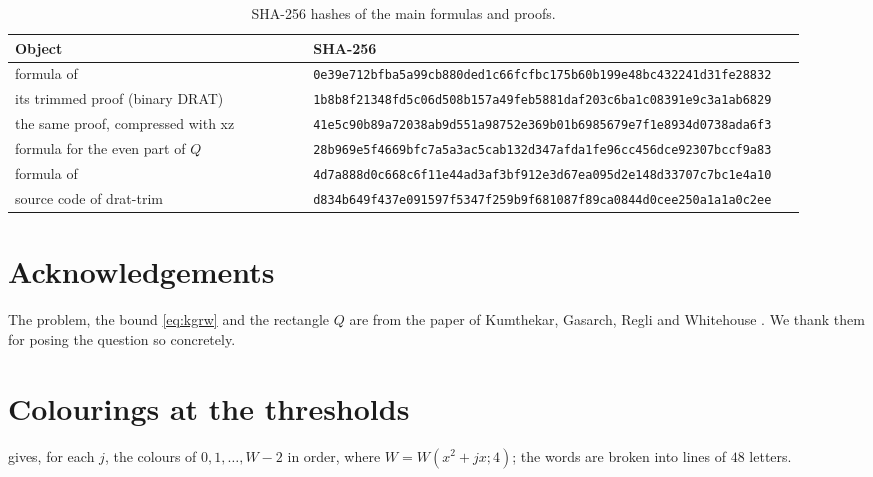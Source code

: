 \documentclass[11pt,colorlinks]{charlie}
\begin{document}
\begin{table}[ht]
\centering\footnotesize
\begin{tabular}{@{}L{0.36\linewidth}L{0.56\linewidth}@{}}
\toprule
Object & SHA-256\\
\midrule
formula of  & \texttt{0e39e712bfba5a99cb880ded1c66fcfb\allowbreak c175b60b199e48bc432241d31fe28832}\\
its trimmed proof (binary DRAT) & \texttt{1b8b8f21348fd5c06d508b157a49feb5\allowbreak 881daf203c6ba1c08391e9c3a1ab6829}\\
the same proof, compressed with xz & \texttt{41e5c90b89a72038ab9d551a98752e36\allowbreak 9b01b6985679e7f1e8934d0738ada6f3}\\
formula for the even part of $Q$ & \texttt{28b969e5f4669bfc7a5a3ac5cab132d3\allowbreak 47afda1fe96cc456dce92307bccf9a83}\\
formula of  & \texttt{4d7a888d0c668c6f11e44ad3af3bf912\allowbreak e3d67ea095d2e148d33707c7bc1e4a10}\\
source code of drat-trim & \texttt{d834b649f437e091597f5347f259b9f6\allowbreak 81087f89ca0844d0cee250a1a1a0c2ee}\\
\bottomrule
\end{tabular}
\caption{SHA-256 hashes of the main formulas and proofs.}
\label{tab:hashes}
\end{table}

\section*{Acknowledgements}
The problem, the bound \eqref{eq:kgrw} and the rectangle $Q$ are from the paper of Kumthekar, Gasarch, Regli and Whitehouse \cite{KGRW}. We thank them for posing the question so concretely.

\appendix
\section{Colourings at the thresholds}\label{app:words}

 gives, for each $j$, the colours of $0,1,\dots,W-2$ in order, where $W=W(x^2+jx;4)$; the words are broken into lines of $48$ letters.
\end{document}
